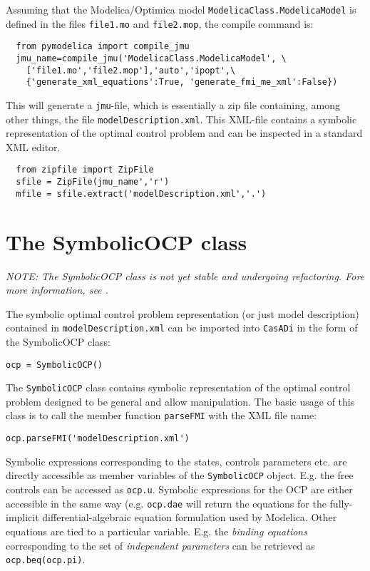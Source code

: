 \documentclass[a4paper,12pt]{book}
\newcommand{\CasADi}{\texttt{CasADi}\xspace}
\begin{document}
Assuming that the Modelica/Optimica model \texttt{ModelicaClass.ModelicaModel} is defined in the files \texttt{file1.mo} and \texttt{file2.mop}, the compile command is:
\begin{verbatim}
  from pymodelica import compile_jmu
  jmu_name=compile_jmu('ModelicaClass.ModelicaModel', \
    ['file1.mo','file2.mop'],'auto','ipopt',\
    {'generate_xml_equations':True, 'generate_fmi_me_xml':False})
\end{verbatim}

This will generate a \texttt{jmu}-file, which is essentially a zip file containing, among other things, the file \texttt{modelDescription.xml}. This XML-file contains a symbolic representation of the optimal control problem and can be inspected in a standard XML editor.
\begin{verbatim}
  from zipfile import ZipFile
  sfile = ZipFile(jmu_name','r')
  mfile = sfile.extract('modelDescription.xml','.')
\end{verbatim}

\section{The SymbolicOCP class} \label{sec:modelica_import}
\emph{NOTE: The SymbolicOCP class is not yet stable and undergoing refactoring. Fore more information, see .}

The symbolic optimal control problem representation (or just model description) contained in \texttt{modelDescription.xml} can be imported into \CasADi in the form of the SymbolicOCP class:
\begin{verbatim}
ocp = SymbolicOCP()
\end{verbatim}

The \texttt{SymbolicOCP} class contains symbolic representation of the optimal control problem designed to be general and allow manipulation. The basic usage of this class is to call the member function \texttt{parseFMI} with the XML file name:
\begin{verbatim}
ocp.parseFMI('modelDescription.xml')
\end{verbatim}

Symbolic expressions corresponding to the states, controls parameters etc. are directly accessible as member variables of the \texttt{SymbolicOCP} object. E.g. the free controls can be accessed as \verb|ocp.u|. Symbolic expressions for the OCP are either accessible in the same way (e.g. \verb|ocp.dae| will return the equations for the fully-implicit differential-algebraic equation formulation used by Modelica. Other equations are tied to a particular variable. E.g. the \emph{binding equations} corresponding to the set of \emph{independent parameters} can be retrieved as \verb|ocp.beq(ocp.pi)|. 
\end{document}
